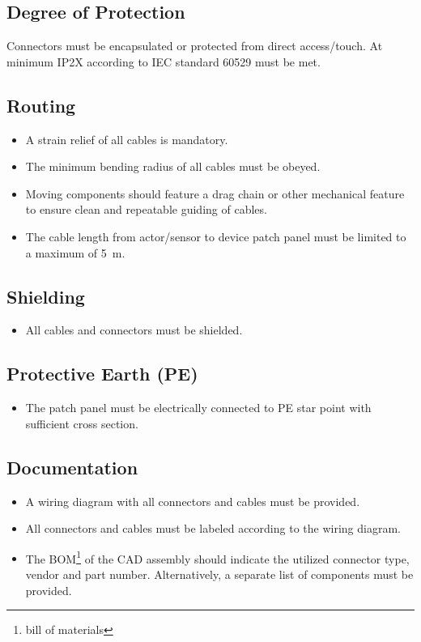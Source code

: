 \subsection{Degree of Protection}
Connectors must be encapsulated or protected from direct access/touch. At minimum IP2X according to IEC standard 60529 must be met.

\subsection{Routing}
\begin{itemize}
    \item A strain relief of all cables is mandatory.
    \item The minimum bending radius of all cables must be obeyed.
    \item Moving components should feature a drag chain or other mechanical feature to ensure clean and repeatable guiding of cables.
    \item The cable length from actor/sensor to device patch panel must be limited to a maximum of 5~m.
\end{itemize}

\subsection{Shielding}
\begin{itemize}
    \item All cables and connectors must be shielded.
\end{itemize}

\subsection{Protective Earth (PE)}
\begin{itemize}
    \item The patch panel must be electrically connected to PE star point with sufficient cross section.
\end{itemize}

\subsection{Documentation}
\begin{itemize}
    \item A wiring diagram with all connectors and cables must be provided.
    \item All connectors and cables must be labeled according to the wiring diagram.
    \item The BOM\footnote{bill of materials} of the CAD assembly should indicate the utilized connector type, vendor and part number. Alternatively, a separate list of components must be provided.
\end{itemize}

